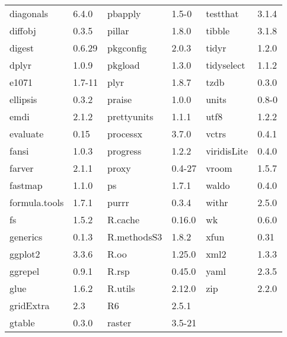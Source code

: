 \begin{table}[ht]
\begin{tabular}{llllll}
  diagonals & 6.4.0 & pbapply & 1.5-0 & testthat & 3.1.4 \\ 
  diffobj & 0.3.5 & pillar & 1.8.0 & tibble & 3.1.8 \\ 
  digest & 0.6.29 & pkgconfig & 2.0.3 & tidyr & 1.2.0 \\ 
  dplyr & 1.0.9 & pkgload & 1.3.0 & tidyselect & 1.1.2 \\ 
  e1071 & 1.7-11 & plyr & 1.8.7 & tzdb & 0.3.0 \\ 
  ellipsis & 0.3.2 & praise & 1.0.0 & units & 0.8-0 \\ 
  emdi & 2.1.2 & prettyunits & 1.1.1 & utf8 & 1.2.2 \\ 
  evaluate & 0.15 & processx & 3.7.0 & vctrs & 0.4.1 \\ 
  fansi & 1.0.3 & progress & 1.2.2 & viridisLite & 0.4.0 \\ 
  farver & 2.1.1 & proxy & 0.4-27 & vroom & 1.5.7 \\ 
  fastmap & 1.1.0 & ps & 1.7.1 & waldo & 0.4.0 \\ 
  formula.tools & 1.7.1 & purrr & 0.3.4 & withr & 2.5.0 \\ 
  fs & 1.5.2 & R.cache & 0.16.0 & wk & 0.6.0 \\ 
  generics & 0.1.3 & R.methodsS3 & 1.8.2 & xfun & 0.31 \\ 
  ggplot2 & 3.3.6 & R.oo & 1.25.0 & xml2 & 1.3.3 \\ 
  ggrepel & 0.9.1 & R.rsp & 0.45.0 & yaml & 2.3.5 \\ 
  glue & 1.6.2 & R.utils & 2.12.0 & zip & 2.2.0 \\ 
  gridExtra & 2.3 & R6 & 2.5.1 &  &  \\ 
  gtable & 0.3.0 & raster & 3.5-21 &  &  \\ 
   \bottomrule
\end{tabular}
\end{table}
